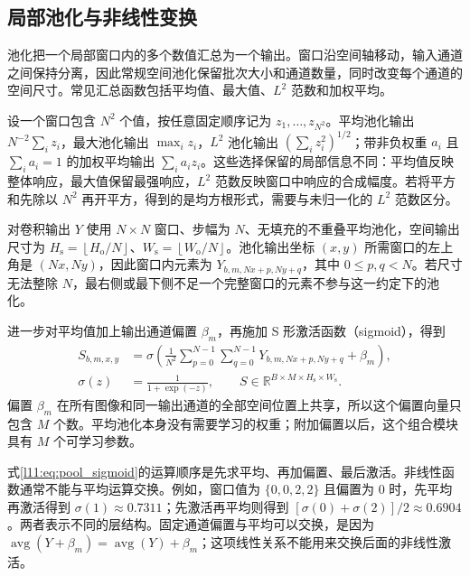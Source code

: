 \subsection{局部池化与非线性变换}
\label{l11:subsec:pooling}

池化把一个局部窗口内的多个数值汇总为一个输出。窗口沿空间轴移动，输入通道之间保持分离，因此常规空间池化保留批次大小和通道数量，同时改变每个通道的空间尺寸。常见汇总函数包括平均值、最大值、$L^2$ 范数和加权平均。

设一个窗口包含 $N^2$ 个值，按任意固定顺序记为 $z_1,\ldots,z_{N^2}$。平均池化输出 $N^{-2}\sum_i z_i$，最大池化输出 $\max_i z_i$，$L^2$ 池化输出 $(\sum_i z_i^2)^{1/2}$；带非负权重 $a_i$ 且 $\sum_i a_i=1$ 的加权平均输出 $\sum_i a_i z_i$。这些选择保留的局部信息不同：平均值反映整体响应，最大值保留最强响应，$L^2$ 范数反映窗口中响应的合成幅度。若将平方和先除以 $N^2$ 再开平方，得到的是均方根形式，需要与未归一化的 $L^2$ 范数区分。

对卷积输出 $Y$ 使用 $N\times N$ 窗口、步幅为 $N$、无填充的不重叠平均池化，空间输出尺寸为 $H_{\mathrm{s}}=\left\lfloor H_{\mathrm{o}}/N\right\rfloor$、$W_{\mathrm{s}}=\left\lfloor W_{\mathrm{o}}/N\right\rfloor$。池化输出坐标 $(x,y)$ 所需窗口的左上角是 $(Nx,Ny)$，因此窗口内元素为 $Y_{b,m,Nx+p,Ny+q}$，其中 $0\le p,q<N$。若尺寸无法整除 $N$，最右侧或最下侧不足一个完整窗口的元素不参与这一约定下的池化。

进一步对平均值加上输出通道偏置 $\beta_m$，再施加 S 形激活函数（sigmoid），得到
\begin{equation}
\begin{aligned}
  S_{b,m,x,y}
  &=\sigma\!\left(
     \frac{1}{N^2}\sum_{p=0}^{N-1}\sum_{q=0}^{N-1}
     Y_{b,m,Nx+p,Ny+q}+\beta_m
    \right),\\
  \sigma(z)&=\frac{1}{1+\exp(-z)},\qquad
  S\in\mathbb{R}^{B\times M\times H_{\mathrm{s}}\times W_{\mathrm{s}}}.
\end{aligned}
\label{l11:eq:pool_sigmoid}
\end{equation}
偏置 $\beta_m$ 在所有图像和同一输出通道的全部空间位置上共享，所以这个偏置向量只包含 $M$ 个数。平均池化本身没有需要学习的权重；附加偏置以后，这个组合模块具有 $M$ 个可学习参数。

式\eqref{l11:eq:pool_sigmoid}的运算顺序是先求平均、再加偏置、最后激活。非线性函数通常不能与平均运算交换。例如，窗口值为 $\{0,0,2,2\}$ 且偏置为 $0$ 时，先平均再激活得到 $\sigma(1)\approx0.7311$；先激活再平均则得到 $[\sigma(0)+\sigma(2)]/2\approx0.6904$。两者表示不同的层结构。固定通道偏置与平均可以交换，是因为 $\operatorname{avg}(Y+\beta_m)=\operatorname{avg}(Y)+\beta_m$；这项线性关系不能用来交换后面的非线性激活。

